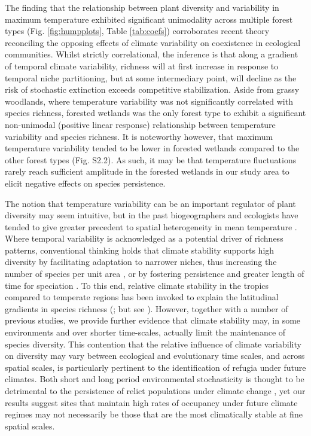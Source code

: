The finding that the relationship between plant diversity and variability in maximum temperature exhibited significant unimodality across multiple forest types (Fig. \ref{fig:humpplots}, Table \ref{tab:coefs}) corroborates recent theory \citep{Adler2008} reconciling the opposing effects of climate variability on coexistence in ecological communities. Whilst strictly correlational, the inference is that along a gradient of temporal climate variability, richness will at first increase in response to temporal niche partitioning, but at some intermediary point, will decline as the risk of stochastic extinction exceeds competitive stabilization. Aside from grassy woodlands, where temperature variability was not significantly correlated with species richness, forested wetlands was the only forest type to exhibit a significant non-unimodal (positive linear response) relationship between temperature variability and species richness. It is noteworthy however, that maximum temperature variability tended to be lower in forested wetlands compared to the other forest types (Fig. S2.2). As such, it may be that temperature fluctuations rarely reach sufficient amplitude in the forested wetlands in our study area to elicit negative effects on species persistence. 

The notion that temperature variability can be an important regulator of plant diversity may seem intuitive, but in the past biogeographers and ecologists have tended to give greater precedent to spatial heterogeneity in mean temperature \citep{Currie2004}. Where temporal variability is acknowledged as a potential driver of richness patterns, conventional thinking holds that climate stability supports high diversity by facilitating adaptation to narrower niches, thus increasing the number of species per unit area \citep{Stevens1989}, or by fostering persistence and greater length of time for speciation \citep{McGlone1996, Hopper2009}. To this end, relative climate stability in the tropics compared to temperate regions has been invoked to explain the latitudinal gradients in species richness (\citealp{Stevens1989}; but see \citealp{Gaston1998a}). However, together with a number of previous studies, we provide further evidence that climate stability may, in some environments and over shorter time-scales, actually limit the maintenance of species diversity. This contention that the relative influence of climate variability on diversity may vary between ecological and evolutionary time scales, and across spatial scales, is particularly pertinent to the identification of refugia under future climates. Both short and long period environmental stochasticity is thought to be detrimental to the persistence of relict populations under climate change \citep{Hampe2011}, yet our results suggest sites that maintain high rates of occupancy under future climate regimes may not necessarily be those that are the most climatically stable at fine spatial scales. 

